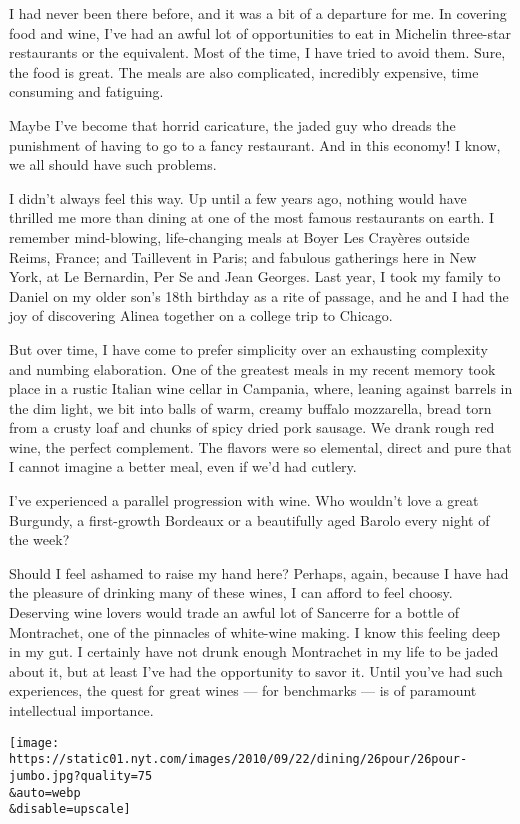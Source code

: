 I had never been there before, and it was a bit of a departure for me.
In covering food and wine, I've had an awful lot of opportunities to eat
in Michelin three-star restaurants or the equivalent. Most of the time,
I have tried to avoid them. Sure, the food is great. The meals are also
complicated, incredibly expensive, time consuming and fatiguing.

Maybe I've become that horrid caricature, the jaded guy who dreads the
punishment of having to go to a fancy restaurant. And in this economy! I
know, we all should have such problems.

I didn't always feel this way. Up until a few years ago, nothing would
have thrilled me more than dining at one of the most famous restaurants
on earth. I remember mind-blowing, life-changing meals at Boyer Les
Crayères outside Reims, France; and Taillevent in Paris; and fabulous
gatherings here in New York, at Le Bernardin, Per Se and Jean Georges.
Last year, I took my family to Daniel on my older son's 18th birthday as
a rite of passage, and he and I had the joy of discovering Alinea
together on a college trip to Chicago.

But over time, I have come to prefer simplicity over an exhausting
complexity and numbing elaboration. One of the greatest meals in my
recent memory took place in a rustic Italian wine cellar in Campania,
where, leaning against barrels in the dim light, we bit into balls of
warm, creamy buffalo mozzarella, bread torn from a crusty loaf and
chunks of spicy dried pork sausage. We drank rough red wine, the perfect
complement. The flavors were so elemental, direct and pure that I cannot
imagine a better meal, even if we'd had cutlery.

I've experienced a parallel progression with wine. Who wouldn't love a
great Burgundy, a first-growth Bordeaux or a beautifully aged Barolo
every night of the week?

Should I feel ashamed to raise my hand here? Perhaps, again, because I
have had the pleasure of drinking many of these wines, I can afford to
feel choosy. Deserving wine lovers would trade an awful lot of Sancerre
for a bottle of Montrachet, one of the pinnacles of white-wine making. I
know this feeling deep in my gut. I certainly have not drunk enough
Montrachet in my life to be jaded about it, but at least I've had the
opportunity to savor it. Until you've had such experiences, the quest
for great wines --- for benchmarks --- is of paramount intellectual
importance.

\texttt{[image: https://static01.nyt.com/images/2010/09/22/dining/26pour/26pour-jumbo.jpg?quality=75\\\&auto=webp\\\&disable=upscale]}

